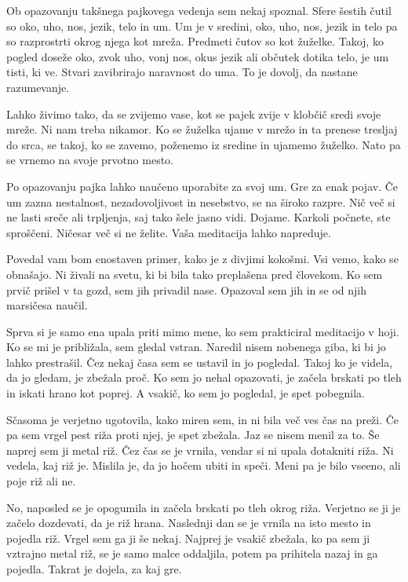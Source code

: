 Ob opazovanju takšnega pajkovega vedenja sem nekaj spoznal. Sfere šestih čutil so oko, uho, nos, jezik, telo in um. Um je v sredini, oko, uho, nos, jezik in telo pa so razprostrti okrog njega kot mreža. Predmeti čutov so kot žuželke. Takoj, ko pogled doseže oko, zvok uho, vonj nos, okus jezik ali občutek dotika telo, je um tisti, ki ve. Stvari zavibrirajo naravnost do uma. To je dovolj, da nastane razumevanje.

Lahko živimo tako, da se zvijemo vase, kot se pajek zvije v klobčič sredi svoje mreže. Ni nam treba nikamor. Ko se žuželka ujame v mrežo in ta prenese tresljaj do srca, se takoj, ko se zavemo, poženemo iz sredine in ujamemo žuželko. Nato pa se vrnemo na svoje prvotno mesto.

Po opazovanju pajka lahko naučeno uporabite za svoj um. Gre za enak pojav. Če um zazna nestalnost, nezadovoljivost in nesebstvo, se na široko razpre. Nič več si ne lasti sreče ali trpljenja, saj tako šele jasno vidi. Dojame. Karkoli počnete, ste sproščeni. Ničesar več si ne želite. Vaša meditacija lahko napreduje.


\clearpage


Povedal vam bom enostaven primer, kako je z divjimi kokošmi. Vsi vemo, kako se obnašajo. Ni živali na svetu, ki bi bila tako preplašena pred človekom. Ko sem prvič prišel v ta gozd, sem jih privadil nase. Opazoval sem jih in se od njih marsičesa naučil.

Sprva si je samo ena upala priti mimo mene, ko sem prakticiral meditacijo v hoji. Ko se mi je približala, sem gledal vstran. Naredil nisem nobenega giba, ki bi jo lahko prestrašil. Čez nekaj časa sem se ustavil in jo pogledal. Takoj ko je videla, da jo gledam, je zbežala proč. Ko sem jo nehal opazovati, je začela brskati po tleh in iskati hrano kot poprej. A vsakič, ko sem jo pogledal, je spet pobegnila.

Sčasoma je verjetno ugotovila, kako miren sem, in ni bila več ves čas na preži. Če pa sem vrgel pest riža proti njej, je spet zbežala. Jaz se nisem menil za to. Še naprej sem ji metal riž. Čez čas se je vrnila, vendar si ni upala dotakniti riža. Ni vedela, kaj riž je. Mislila je, da jo hočem ubiti in speči. Meni pa je bilo vseeno, ali poje riž ali ne.

No, naposled se je opogumila in začela brskati po tleh okrog riža. Verjetno se ji je začelo dozdevati, da je riž hrana. Naslednji dan se je vrnila na isto mesto in pojedla riž. Vrgel sem ga ji še nekaj. Najprej je vsakič zbežala, ko pa sem ji vztrajno metal riž, se je samo malce oddaljila, potem pa prihitela nazaj in ga pojedla. Takrat je dojela, za kaj gre.

